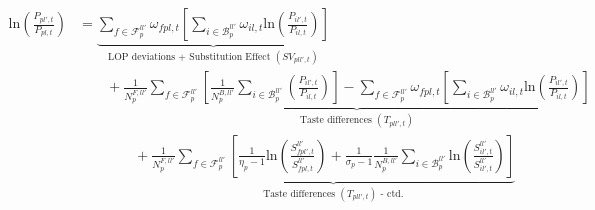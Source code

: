 \begin{linenomath*}
    \begin{equation}\label{eq:cle_decomp2}
        \begin{aligned}
        \text{ln}\left(\frac{P_{pl',t}}{P_{pl,t}}\right)
            &=  \underbrace{
                \sum_{f \in \mathcal{F}^{ll'}_{p}} 
                    \omega_{fpl,t}
                    \left[
                        \sum_{i \in \mathcal{B}^{ll'}_{p}} 
                        \omega_{il,t}
                        \text{ln}
                        \left(
                            \frac{P_{il',t}}{P_{il,t}}
                        \right)
                    \right]
                }_{\text{LOP deviations + Substitution Effect } (SV_{pll',t})} \\
                & \qquad + 
                \underbrace{
                    \frac{1}{N^{F,ll'}_{p}}
                    \sum_{f \in \mathcal{F}^{ll'}_{p}} 
                        \left[
                            \frac{1}{N^{B,ll'}_{p}}
                            \sum_{i \in \mathcal{B}^{ll'}_{p}} 
                            \left(
                                \frac{P_{il',t}}{P_{il,t}}
                            \right)
                        \right]
                    -
                    \sum_{f \in \mathcal{F}^{ll'}_{p}} 
                    \omega_{fpl,t}
                    \left[
                        \sum_{i \in \mathcal{B}^{ll'}_{p}} 
                        \omega_{il,t}
                        \text{ln}
                        \left(
                            \frac{P_{il',t}}{P_{il,t}}
                        \right)
                    \right]
                }_{\text{Taste differences } (T_{pll',t})} \\
                & \qquad \qquad + 
                \underbrace{
                    \frac{1}{N^{F,ll'}_{p}}
                    \sum_{f \in \mathcal{F}^{ll'}_{p}} 
                    \left[
                        \frac{1}{\eta_p-1}
                        \text{ln}
                        \left(
                            \frac{S^{ll'}_{fpl',t}}{S^{ll'}_{fpl,t}}
                        \right)
                        +
                        \frac{1}{\sigma_p-1}
                        \frac{1}{N^{B,ll'}_{p}}
                        \sum_{i \in \mathcal{B}^{ll'}_{p}} 
                            \text{ln}
                            \left(
                                \frac{S^{ll'}_{il',t}}{S^{ll'}_{il',t}}
                            \right)
                    \right]
                }_{\text{Taste differences } (T_{pll',t}) \text{ - ctd.}} \\

\end{aligned}
\end{equation}
\end{linenomath*}
